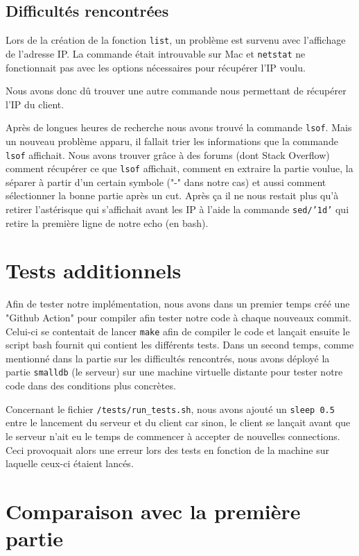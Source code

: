 \documentclass[utf8]{article}
\begin{document}
\subsection{Difficultés rencontrées}

Lors de la création de la fonction \texttt{list}, un problème est survenu avec l'affichage de l'adresse IP. La commande  était introuvable sur Mac et \texttt{netstat} ne fonctionnait pas avec les options nécessaires pour récupérer l'IP voulu.

Nous avons donc dû trouver une autre commande nous permettant de récupérer l'IP du client.

Après de longues heures de recherche nous avons trouvé la commande \texttt{lsof}. Mais un nouveau problème apparu, il fallait trier les informations que la commande \texttt{lsof} affichait. Nous avons trouver grâce à des forums (dont Stack Overflow) comment récupérer ce que \texttt{lsof} affichait, comment en extraire la partie voulue, la séparer à partir d'un certain symbole ("-" dans notre cas) et aussi comment sélectionner la bonne partie après un cut. Après ça il ne nous restait plus qu'à retirer l'astérisque qui s'affichait avant les IP à l'aide la commande \texttt{sed/'1d'} qui retire la première ligne de notre echo (en bash).

\section{Tests additionnels}

Afin de tester notre implémentation, nous avons dans un premier temps créé une "Github Action" pour compiler afin tester notre code à chaque nouveaux commit. Celui-ci se contentait de lancer \texttt{make} afin de compiler le code et lançait ensuite le script bash fournit qui contient les différents tests. Dans un second temps, comme mentionné dans la partie sur les difficultés rencontrés, nous avons déployé la partie \texttt{smalldb} (le serveur) sur une machine virtuelle distante pour tester notre code dans des conditions plus concrètes.

Concernant le fichier \texttt{/tests/run\_tests.sh}, nous avons ajouté un \texttt{sleep 0.5} entre le lancement du serveur et du client car sinon, le client se lançait avant que le serveur n'ait eu le temps de commencer à accepter de nouvelles connections. Ceci provoquait alors une erreur lors des tests en fonction de la machine sur laquelle ceux-ci étaient lancés.

\section{Comparaison avec la première partie}
\end{document}
